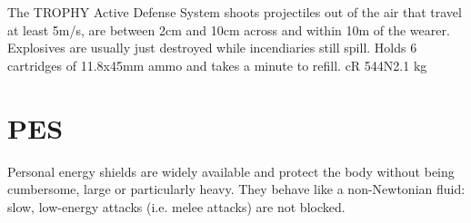 \begin{multicols}{2}
	{The TROPHY Active Defense System shoots projectiles out of the air that
	travel at least 5m/s,
	are between 2cm and 10cm across
	and within 10m of the wearer.
	Explosives are usually just destroyed while incendiaries still spill.
	Holds 6 cartridges of 11.8x45mm ammo and takes a minute to refill.}
	{cR 54}{4}{N}{2.1 kg}
\end{multicols}

\section{PES}
Personal energy shields are widely available
	and protect the body without being cumbersome,
	large or particularly heavy.
They behave like a non-Newtonian fluid:
	slow, low-energy attacks (i.e. melee attacks) are not blocked.
\par%
\vspace*{3mm}
\begin{multicols}{2}
\end{multicols}
